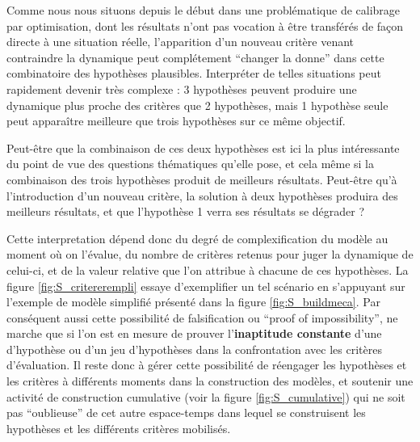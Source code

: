 Comme nous nous situons depuis le début dans une problématique de calibrage par optimisation, dont les résultats n'ont pas vocation à être transférés de façon directe à une situation réelle, l'apparition d'un nouveau critère venant contraindre la dynamique peut complétement \enquote{changer la donne} dans cette combinatoire des hypothèses plausibles. Interpréter de telles situations peut rapidement devenir très complexe : 3 hypothèses peuvent produire une dynamique plus proche des critères que 2 hypothèses, mais 1 hypothèse seule peut apparaître meilleure que trois hypothèses sur ce même objectif.

Peut-être que la combinaison de ces deux hypothèses est ici la plus intéressante du point de vue des questions thématiques qu'elle pose, et cela même si la combinaison des trois hypothèses produit de meilleurs résultats. Peut-être qu'à l'introduction d'un nouveau critère, la solution à deux hypothèses produira des meilleurs résultats, et que l'hypothèse 1 verra ses résultats se dégrader ?

Cette interpretation dépend donc du degré de complexification du modèle au moment où on l'évalue, du nombre de critères retenus pour juger la dynamique de celui-ci, et de la valeur relative que l'on attribue à chacune de ces hypothèses. La figure \ref{fig:S_critererempli} essaye d'exemplifier un tel scénario en s'appuyant sur l'exemple de modèle simplifié présenté dans la figure \ref{fig:S_buildmeca}. Par conséquent aussi cette possibilité de falsification ou \foreignquote{english}{proof of impossibility}, ne marche que si l'on est en mesure de prouver l'\textbf{inaptitude constante} d'une d'hypothèse ou d'un jeu d'hypothèses dans la confrontation avec les critères d’évaluation. Il reste donc à gérer cette possibilité de réengager les hypothèses et les critères à différents moments dans la construction des modèles, et soutenir une activité de construction cumulative (voir la figure \ref{fig:S_cumulative}) qui ne soit pas \enquote{oublieuse} de cet autre espace-temps dans lequel se construisent les hypothèses et les différents critères mobilisés.
